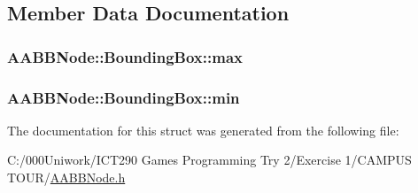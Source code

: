 \subsection{Member Data Documentation}
\subsubsection[{\texorpdfstring{max}{max}}]{ A\+A\+B\+B\+Node\+::\+Bounding\+Box\+::max}\hypertarget{struct_a_a_b_b_node_1_1_bounding_box_a75e2a4b821ffd9327092d1911fba647a}{}\label{struct_a_a_b_b_node_1_1_bounding_box_a75e2a4b821ffd9327092d1911fba647a}
\subsubsection[{\texorpdfstring{min}{min}}]{ A\+A\+B\+B\+Node\+::\+Bounding\+Box\+::min}\hypertarget{struct_a_a_b_b_node_1_1_bounding_box_a9c046f23dd984b1bc04afe0257b68657}{}\label{struct_a_a_b_b_node_1_1_bounding_box_a9c046f23dd984b1bc04afe0257b68657}


The documentation for this struct was generated from the following file\+:\begin{DoxyCompactItemize}
\item 
C\+:/000\+Uniwork/\+I\+C\+T290 Games Programming Try 2/\+Exercise 1/\+C\+A\+M\+P\+U\+S T\+O\+U\+R/\hyperlink{_a_a_b_b_node_8h}{A\+A\+B\+B\+Node.\+h}\end{DoxyCompactItemize}
